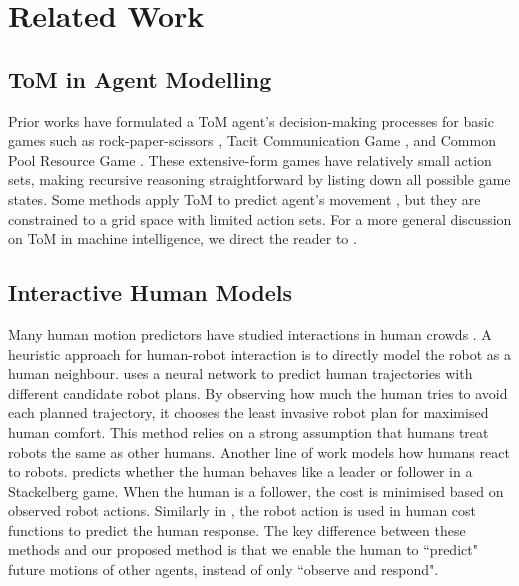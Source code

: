 \section{Related Work}

\subsection{ToM in Agent Modelling}
\label{sec:ToM}
Prior works have formulated a ToM agent's decision-making processes for basic games such as rock-paper-scissors \cite{de2013much}, Tacit Communication Game \cite{de2015higher}, and Common Pool Resource Game \cite{von2017minds}. 
These extensive-form games have relatively small action sets, making recursive reasoning straightforward by listing down all possible game states. Some methods apply ToM to predict agent's movement \cite{baker2014modeling, rabinowitz2018machine, tian2021learning}, but they are constrained to a grid space with limited action sets. For a more general discussion on ToM in machine intelligence, we direct the reader to \cite{cuzzolin2020knowing}.

\subsection{Interactive Human Models}
Many human motion predictors have studied interactions in human crowds \cite{sighencea2021review}. A heuristic approach for human-robot interaction is to directly model the robot as a human neighbour. 
\cite{schaefer2021leveraging} uses a neural network to predict human trajectories with different candidate robot plans. By observing how much the human tries to avoid each planned trajectory, it chooses the least invasive robot plan for maximised human comfort. 
This method relies on a strong assumption that humans treat robots the same as other humans. 
Another line of work models how humans react to robots. \cite{tian2022safety} predicts whether the human behaves like a leader or follower in a Stackelberg game. When the human is a follower, the cost is minimised based on observed robot actions. 
Similarly in \cite{geldenbott2024legible, sripathy2021dynamically}, the robot action is used in human cost functions to predict the human response. The key difference between these methods and our proposed method is that we enable the human to ``predict" future motions of other agents, instead of only ``observe and respond".


